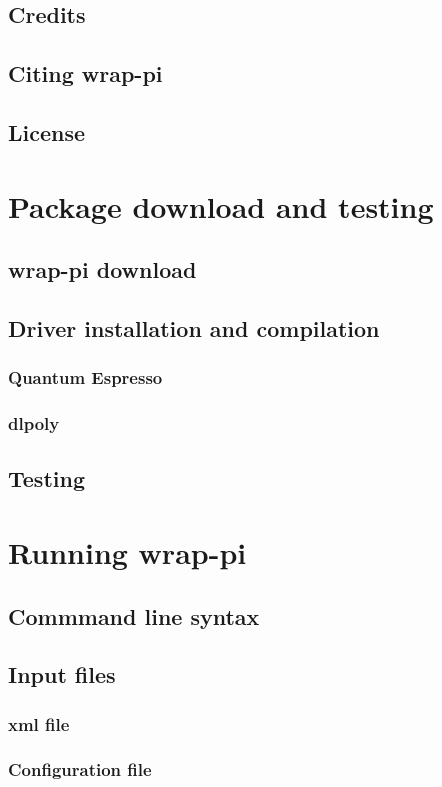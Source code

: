 \documentclass[12pt,fleqn]{report}
\begin{document}
\section{Credits}
\section{Citing wrap-pi}
\section{License}

\chapter{Package download and testing}
\section{wrap-pi download}
\section{Driver installation and compilation}
\subsection{Quantum Espresso}
\subsection{dlpoly}
\section{Testing}

\chapter{Running wrap-pi}
\section{Commmand line syntax}
\section{Input files}
\subsection{xml file}
\subsection{Configuration file}
\end{document}
